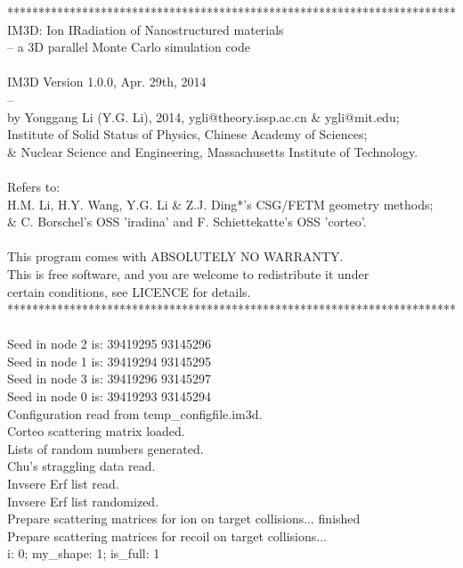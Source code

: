 ************************************************************************\\
IM3D: Ion IRadiation of Nanostructured materials\\
        -- a 3D parallel Monte Carlo simulation code\\
\\
IM3D Version 1.0.0, Apr. 29th, 2014\\
 -- \\
by Yonggang Li (Y.G. Li), 2014, ygli@theory.issp.ac.cn \& ygli@mit.edu;\\
Institute of Solid Status of Physics, Chinese Academy of Sciences;\\
\& Nuclear Science and Engineering, Massachusetts Institute of Technology.\\
\\
Refers to:\\
  H.M. Li, H.Y. Wang, Y.G. Li \& Z.J. Ding*'s CSG/FETM geometry methods;\\
\& C. Borschel's OSS 'iradina' and F. Schiettekatte's OSS 'corteo'.\\
\\
This program comes with ABSOLUTELY NO WARRANTY.\\
This is free software, and you are welcome to redistribute it under\\
certain conditions, see LICENCE for details.\\
************************************************************************\\
\\
Seed in node 2 is: 39419295	93145296\\
Seed in node 1 is: 39419294	93145295\\
Seed in node 3 is: 39419296	93145297\\
Seed in node 0 is: 39419293	93145294\\
Configuration read from temp\_configfile.im3d.\\
Corteo scattering matrix loaded.\\
Lists of random numbers generated.\\
Chu's straggling data read.\\
Invsere Erf list read.\\
Invsere Erf list randomized.\\
Prepare scattering matrices for ion on target collisions... finished\\
Prepare scattering matrices for recoil on target collisions...\\
i: 0; my\_shape:  1; is\_full:   1\\
